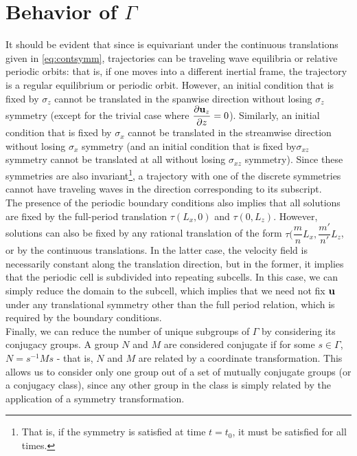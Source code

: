 \section{Behavior of $\Gamma$}

It should be evident that since \pCf is equivariant under the continuous translations given in \eqref{eq:contsymm}, trajectories can be traveling wave equilibria or relative periodic orbits: that is, if one moves into a different inertial frame, the trajectory is a regular equilibrium or periodic orbit. However, an initial condition that is fixed by $\sigma_z$ cannot be translated in the spanwise direction without losing $\sigma_z$ symmetry (except for the trivial case where $\pder{1}{\Vector{u}_z}{z} = 0$). Similarly, an initial condition that is fixed by $\sigma_x$ cannot be translated in the streamwise direction without losing $\sigma_x$ symmetry (and an initial condition that is fixed by$\sigma_{xz}$ symmetry cannot be translated at all without losing $\sigma_{xz}$ symmetry). Since these symmetries are also invariant\footnote{That is, if the symmetry is satisfied at time $t = t_0$, it must be satisfied for all times.}, a trajectory with one of the discrete symmetries cannot have traveling waves in the direction corresponding to its subscript. \\

The presence of the periodic boundary conditions also implies that all solutions are fixed by the full-period translation $\tau(L_x,0)$ and $\tau(0,L_z)$. However, solutions can also be fixed by any rational translation of the form $\tau(\dfrac{m}{n}L_x,\dfrac{m'}{n'}L_z$, or by the continuous translations. In the latter case, the velocity field is necessarily constant along the translation direction, but in the former, it implies that the periodic cell is subdivided into repeating subcells. In this case, we can simply reduce the domain to the subcell, which implies that we need not fix $\mathbf{u}$ under any translational symmetry other than the full period relation, which is required by the boundary conditions. \\

Finally, we can reduce the number of unique subgroups of $\Gamma$ by considering its conjugacy groups. A group $N$ and $M$ are considered conjugate if for some $s \in \Gamma$, $N = s^{-1}Ms$ - that is, $N$ and $M$ are related by a coordinate transformation. This allows us to consider only one group out of a set of mutually conjugate groups (or a conjugacy class), since any other group in the class is simply related by the application of a symmetry transformation. 